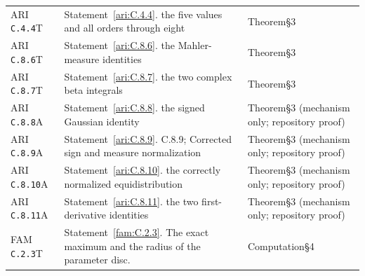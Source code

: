 \begin{longtable}{@{}L{.18\linewidth}L{.48\linewidth}L{.29\linewidth}@{}}
ARI \nolinkurl{C.4.4}\newline T & Statement~\ref{ari:C.4.4}. the five values and all orders through eight\newline {} & Theorem\newline §3\\
ARI \nolinkurl{C.8.6}\newline T & Statement~\ref{ari:C.8.6}. the Mahler-measure identities\newline {} & Theorem\newline §3\\
ARI \nolinkurl{C.8.7}\newline T & Statement~\ref{ari:C.8.7}. the two complex beta integrals\newline {} & Theorem\newline §3\\
ARI \nolinkurl{C.8.8}\newline A & Statement~\ref{ari:C.8.8}. the signed Gaussian identity\newline {} & Theorem\newline §3 (mechanism only; repository proof)\\
ARI \nolinkurl{C.8.9}\newline A & Statement~\ref{ari:C.8.9}. C.8.9; Corrected sign and measure normalization\newline {} & Theorem\newline §3 (mechanism only; repository proof)\\
ARI \nolinkurl{C.8.10}\newline A & Statement~\ref{ari:C.8.10}. the correctly normalized equidistribution\newline {} & Theorem\newline §3 (mechanism only; repository proof)\\
ARI \nolinkurl{C.8.11}\newline A & Statement~\ref{ari:C.8.11}. the two first-derivative identities\newline {} & Theorem\newline §3 (mechanism only; repository proof)\\
FAM \nolinkurl{C.2.3}\newline T & Statement~\ref{fam:C.2.3}. The exact maximum and the radius of the parameter disc.\newline {} & Computation\newline §4\\

\end{longtable}
